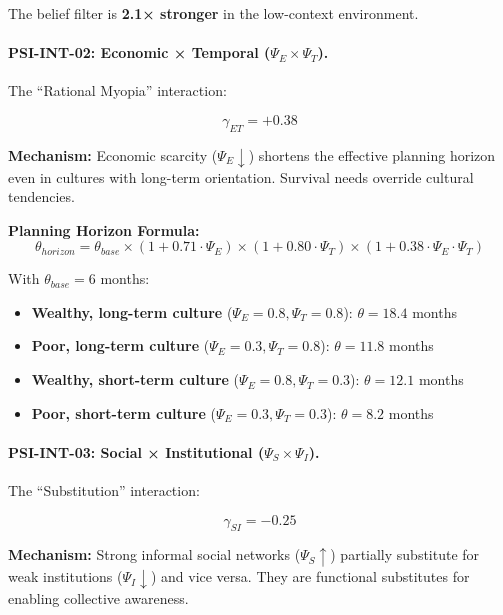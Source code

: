 The belief filter is \textbf{2.1× stronger} in the low-context environment.

\paragraph{PSI-INT-02: Economic × Temporal ($\Psi_E \times \Psi_T$).}

The ``Rational Myopia'' interaction:

\begin{equation}
\gamma_{ET} = +0.38
\end{equation}

\textbf{Mechanism:} Economic scarcity ($\Psi_E \downarrow$) shortens the effective planning horizon even in cultures with long-term orientation. Survival needs override cultural tendencies.

\textbf{Planning Horizon Formula:}
\begin{equation}
\theta_{horizon} = \theta_{base} \times (1 + 0.71 \cdot \Psi_E) \times (1 + 0.80 \cdot \Psi_T) \times (1 + 0.38 \cdot \Psi_E \cdot \Psi_T)
\end{equation}

With $\theta_{base} = 6$ months:
\begin{itemize}
    \item \textbf{Wealthy, long-term culture} ($\Psi_E = 0.8, \Psi_T = 0.8$): $\theta = 18.4$ months
    \item \textbf{Poor, long-term culture} ($\Psi_E = 0.3, \Psi_T = 0.8$): $\theta = 11.8$ months
    \item \textbf{Wealthy, short-term culture} ($\Psi_E = 0.8, \Psi_T = 0.3$): $\theta = 12.1$ months
    \item \textbf{Poor, short-term culture} ($\Psi_E = 0.3, \Psi_T = 0.3$): $\theta = 8.2$ months
\end{itemize}

\paragraph{PSI-INT-03: Social × Institutional ($\Psi_S \times \Psi_I$).}

The ``Substitution'' interaction:

\begin{equation}
\gamma_{SI} = -0.25
\end{equation}

\textbf{Mechanism:} Strong informal social networks ($\Psi_S \uparrow$) partially substitute for weak institutions ($\Psi_I \downarrow$) and vice versa. They are functional substitutes for enabling collective awareness.


